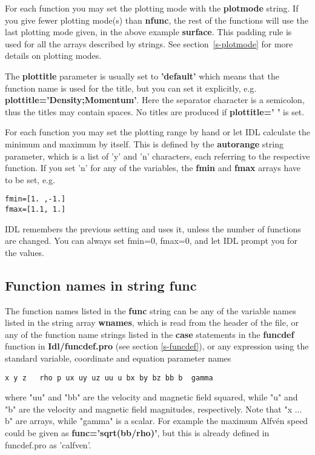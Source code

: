    For each function you may set the plotting mode with the {\bf plotmode} string.
   If you give fewer plotting mode(s) than {\bf nfunc}, the rest of
   the functions will use the last plotting mode given, in the above example
   {\bf surface}. This padding rule is used for all the arrays described 
   by strings. See section~\ref{s-plotmode} for more details on plotting modes.

   The {\bf plottitle} parameter is usually set to {\bf 'default'} which
   means that the function name is used for the title, but you can set it
   explicitly, e.g. {\bf plottitle='Density;Momentum'}. Here the 
   separator character is a semicolon, thus the titles may contain spaces.
   No titles are produced if {\bf plottitle=' '} is set.

   For each function you may set the plotting range by hand or let IDL
   calculate the minimum and maximum by itself. This is defined by
   the {\bf autorange} string parameter, which is a list of 'y' and 'n'
   characters, each referring to the respective function. If you set 'n'
   for any of the variables, the {\bf fmin} and {\bf fmax} arrays have
   to be set, e.g.
\begin{verbatim}
fmin=[1. ,-1.]
fmax=[1.1, 1.]
\end{verbatim}
   IDL remembers the previous setting and uses it, unless the number
   of functions are changed. You can always set fmin=0, fmax=0, and let
   IDL prompt you for the values.

\subsection{Function names in string func \label{s-functions}}

   The function names listed in the {\bf func} string can be any of 
   the variable names listed in the string array {\bf wnames}, which is 
   read from the header of the file, or any of the function name strings 
   listed in the {\bf case} statements in the {\bf funcdef} 
   function in {\bf Idl/funcdef.pro} (see section \ref{s-funcdef}), 
   or any expression using the standard variable, 
   coordinate and equation parameter names 
\begin{verbatim}
x y z   rho p ux uy uz uu u bx by bz bb b  gamma
\end{verbatim}
   where "uu" and "bb" are the velocity and magnetic field squared, while
   "u" and "b" are the velocity and magnetic field magnitudes, 
   respectively. Note that "x ... b" are arrays, while  "gamma" is
   a scalar.  For example the maximum Alfv\'en 
   speed could be given as {\bf func='sqrt(bb/rho)'}, but this is already 
   defined in funcdef.pro as 'calfven'. 

